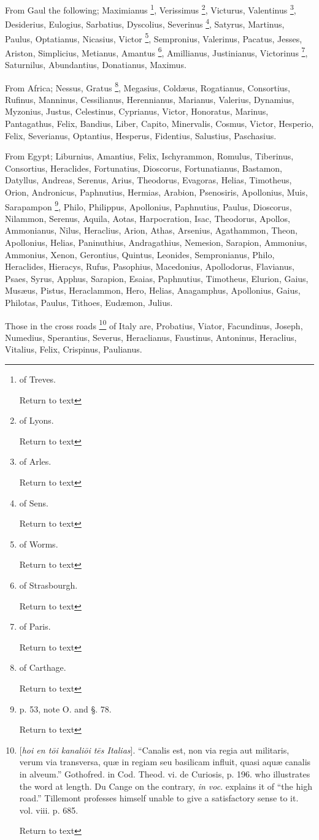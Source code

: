 From Gaul the following; Maximianus \footnote{of
Treves.

Return to text},
Verissimus \footnote{of Lyons.

Return to text}, Victurus, Valentinus
\footnote{of Arles.

Return to text}, Desiderius,
Eulogius, Sarbatius, Dyscolius, Severinus \footnote{of
Sens.

Return to text}, Satyrus, Martinus,
Paulus, Optatianus, Nicasius, Victor \footnote{of Worms.

Return to text}, Sempronius, Valerinus,
Pacatus, Jesses, Ariston, Simplicius, Metianus, Amantus \footnote{of
Strasbourgh.

Return to text},
Amillianus, Justinianus, Victorinus \footnote{of Paris.

Return to text}, Saturnilus, Abundantius,
Donatianus, Maximus.

From Africa; Nessus, Gratus \footnote{of Carthage.

Return to text}, Megasius,
Coldæus, Rogatianus, Consortius, Rufinus, Manninus, Cessilianus,
Herennianus, Marianus, Valerius, Dynamius, Myzonius, Justus,
Celestinus, Cyprianus, Victor, Honoratus, Marinus, Pantagathus, Felix,
Bandius, Liber, Capito, Minervalis, Cosmus, Victor, Hesperio, Felix,
Severianus, Optantius, Hesperus, Fidentius, Salustius, Paschasius.

From Egypt; Liburnius, Amantius, Felix,
Ischyrammon, Romulus, Tiberinus, Consortius, Heraclides, Fortunatius,
Dioscorus, Fortunatianus, Bastamon, Datyllus, Andreas, Serenus, Arius,
Theodorus, Evagoras, Helias, Timotheus, Orion, Andronicus, Paphnutius,
Hermias, Arabion, Psenosiris, Apollonius, Muis, Sarapampon \footnote{p. 53, note O. and §. 78.

Return to text},
Philo, Philippus, Apollonius, Paphnutius, Paulus, Dioscorus, Nilammon,
Serenus, Aquila, Aotas, Harpocration, Isac, Theodorus, Apollos,
Ammonianus, Nilus, Heraclius, Arion, Athas, Arsenius, Agathammon,
Theon, Apollonius, Helias, Paninuthius, Andragathius, Nemesion,
Sarapion, Ammonius, Ammonius, Xenon, Gerontius, Quintus, Leonides,
Sempronianus, Philo, Heraclides, Hieracys, Rufus, Pasophius,
Macedonius, Apollodorus, Flavianus, Psaes, Syrus, Apphus, Sarapion,
Esaias, Paphnutius, Timotheus, Elurion, Gaius, Musæus, Pistus,
Heraclammon, Hero, Helias, Anagamphus, Apollonius, Gaius, Philotas,
Paulus, Tithoes, Eudæmon, Julius.

Those in the cross roads \footnote{[\emph{hoi en t\={o}i kanali\={o}i t\={e}s
Italias}]. ``Canalis est, non via regia aut militaris, verum via
transversa, quæ in regiam seu basilicam influit, quasi aquæ canalis
in alveum.'' Gothofred. in Cod. Theod. vi. de Curiosis, p. 196. who
illustrates the word at length. Du Cange on the contrary, \emph{in voc}.
explains it of ``the high road.'' Tillemont professes himself unable to
give a satisfactory sense to it. vol. viii. p. 685.

Return to text} of Italy are, Probatius,
Viator, Facundinus, Joseph, Numedius, Sperantius, Severus,
Heraclianus, Faustinus, Antoninus, Heraclius, Vitalius, Felix,
Crispinus, Paulianus.

